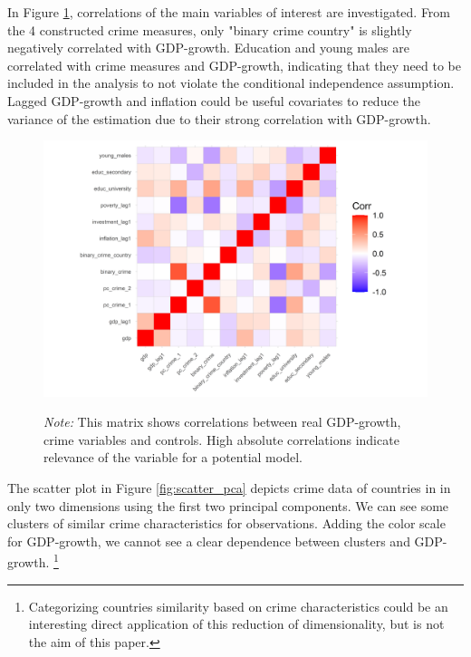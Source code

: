 \documentclass[a4paper,12pt]{article}
\begin{document}
In Figure \ref{fig:corr_matrix_paper}, correlations of the main variables of interest are investigated. From the 4 constructed crime measures, only "binary crime country" is slightly negatively correlated with GDP-growth. Education and young males are correlated with crime measures and GDP-growth, indicating that they need to be included in the analysis to not violate the conditional independence assumption. Lagged GDP-growth and inflation could be useful covariates to reduce the variance of the estimation due to their strong correlation with GDP-growth. 

\begin{figure}
\begin{minipage}{0.9\textwidth}
  \includegraphics[trim={0 0 0 0},width=\linewidth]{charts/corr_matrix_paper.png}
\begin{flushleft}
\footnotesize{\textit{Note:} This matrix shows correlations between real GDP-growth, crime variables and controls. High absolute correlations indicate relevance of the variable for a potential model.
\label{fig:corr_matrix_paper}	
}
\end{flushleft}
\end{minipage}
\end{figure}

The scatter plot in Figure \ref{fig:scatter_pca} depicts crime data of countries in in only two dimensions using the first two principal components. We can see some clusters of similar crime characteristics for observations. Adding the color scale for GDP-growth, we cannot see a clear dependence between clusters and GDP-growth. \footnote{Categorizing countries similarity based on crime characteristics could be an interesting direct application of this reduction of dimensionality, but is not the aim of this paper.}
\end{document}
